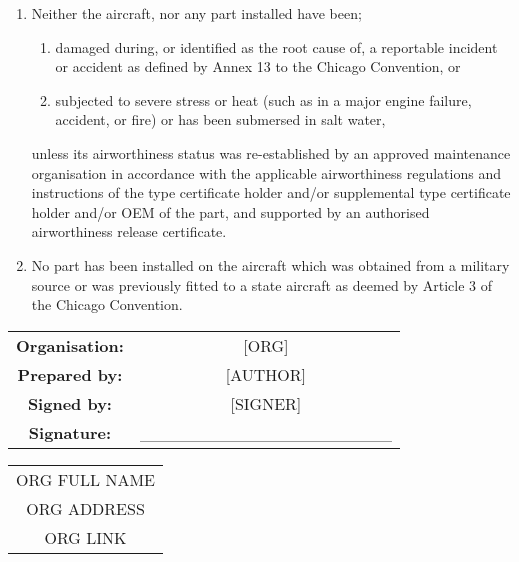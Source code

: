 \documentclass{article}
\begin{document}
 \begin{enumerate}
     \item Neither the aircraft, nor any part installed have been;
     \begin{enumerate}
         \item damaged during, or identified as the root cause of, a reportable incident or accident as defined by Annex 13 to the Chicago Convention, or
         \item subjected to severe stress or heat (such as in a major engine failure, accident, or fire) or has been submersed in salt water,
     \end{enumerate}
     unless its airworthiness status was re-established by an approved maintenance organisation in accordance with the applicable airworthiness regulations and instructions of the type certificate holder and/or supplemental type certificate holder and/or OEM of the part, and supported by an authorised airworthiness release certificate.

     \item No part has been installed on the aircraft which was obtained from a military source or was previously fitted to a state aircraft as deemed by Article 3 of the Chicago Convention.
 \end{enumerate}

\vspace{20pt}

 \begin{tabular}{c c}

      \textbf{Organisation:} & [ORG]\\
      \textbf{Prepared by: } & [AUTHOR] \\
      \textbf{Signed by: } & [SIGNER] \\
      \textbf{Signature: } & \_\_\_\_\_\_\_\_\_\_\_\_\_\_\_\_\_\_\_\_\_ \\
 \end{tabular}

\vspace{20pt}

\begin{tabular}{c}
     ORG FULL NAME \\
     ORG ADDRESS \\
     ORG LINK
\end{tabular}
\end{document}
